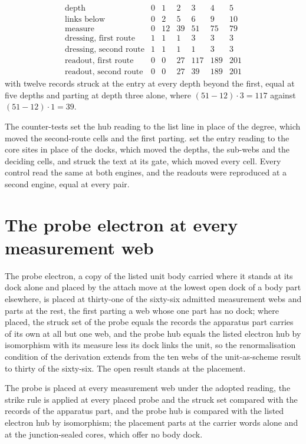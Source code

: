 \begin{chproof}[finite]
\begin{equation}
\begin{array}{lrrrrrr}
\text{depth} & 0 & 1 & 2 & 3 & 4 & 5\\
\text{links below} & 0 & 2 & 5 & 6 & 9 & 10\\
\text{measure} & 0 & 12 & 39 & 51 & 75 & 79\\
\text{dressing, first route} & 1 & 1 & 1 & 3 & 3 & 3\\
\text{dressing, second route} & 1 & 1 & 1 & 1 & 3 & 3\\
\text{readout, first route} & 0 & 0 & 27 & 117 & 189 & 201\\
\text{readout, second route} & 0 & 0 & 27 & 39 & 189 & 201
\end{array}
\end{equation}
with twelve records struck at the entry at every depth beyond the first, equal at five depths and parting at depth three alone, where $(51-12)\cdot 3 = 117$ against $(51-12)\cdot 1 = 39$.

The counter-tests set the hub reading to the list line in place of the degree, which moved the second-route cells and the first parting. set the entry reading to the core sites in place of the docks, which moved the depths, the sub-webs and the deciding cells, and struck the text at its gate, which moved every cell. Every control read the same at both engines, and the readouts were reproduced at a second engine, equal at every pair.
\end{chproof}
\section{The probe electron at every measurement web}\label{mod:I-6-D535118-w-emwp}
\begin{chwall}\label{box:I-6-D535118-w-emwp:1}
The probe electron, a copy of the listed unit body carried where it stands at its dock alone and placed by the attach move at the lowest open dock of a body part elsewhere, is placed at thirty-one of the sixty-six admitted measurement webs and parts at the rest, the first parting a web whose one part has no dock; where placed, the struck set of the probe equals the records the apparatus part carries of its own at all but one web, and the probe hub equals the listed electron hub by isomorphism with its measure less its dock links the unit, so the renormalisation condition of the derivation extends from the ten webs of the unit-as-scheme result to thirty of the sixty-six. The open result stands at the placement.
\end{chwall}
The probe is placed at every measurement web under the adopted reading, the strike rule is applied at every placed probe and the struck set compared with the records of the apparatus part, and the probe hub is compared with the listed electron hub by isomorphism; the placement parts at the carrier words alone and at the junction-sealed cores, which offer no body dock.


